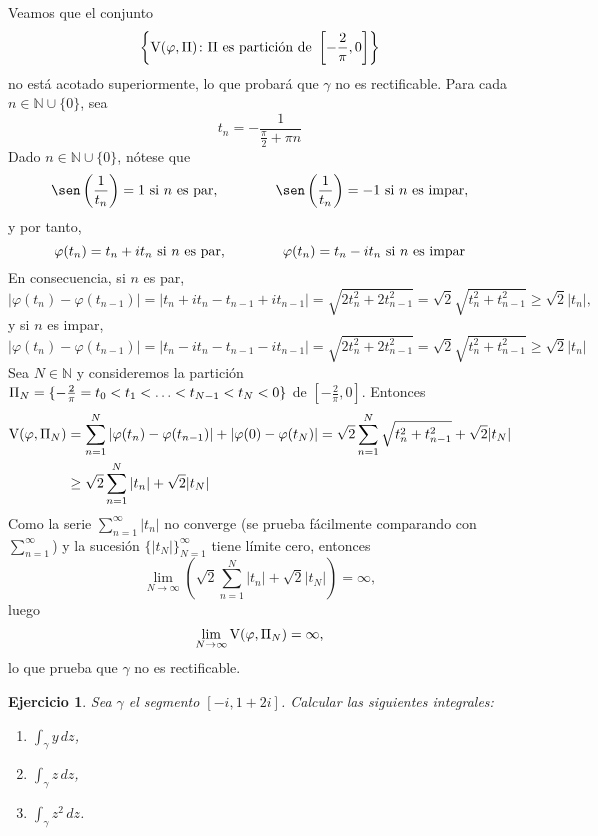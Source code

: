 \documentclass[11pt]{report}
\makeatletter
\renewenvironment{proof}[1][\proofname]{\par
  \pushQED{\qed}%
  \normalfont \topsep\z@skip %
  \trivlist
  \item[\hskip\labelsep
        \itshape
    #1\@addpunct{.}]\ignorespaces
}{%
  \popQED\endtrivlist\@endpefalse
}
\newcommand{\N}{\mathbb N}
\newtheorem{exercise}{Ejercicio}
\makeatother
\begin{document}
\begin{proof}
Veamos que el conjunto
\[\left\{\textup{V}(\varphi, \Pi) \colon \Pi \textup{ es partición de } \left[-\frac{2}{\pi},0\right]\right\}\]
no está acotado superiormente, lo que probará que $\gamma$ no es rectificable. Para cada $n \in \N \cup \{0\}$, sea
\[t_n = -\frac{1}{\frac{\pi}{2}+\pi n}\]
Dado $n \in \N \cup \{0\}$, nótese que \[\sen\left(\frac{1}{t_n}\right) = 1 \textup{ si } n \textup{ es par}, \qquad \qquad \sen\left(\frac{1}{t_n}\right) = -1 \textup{ si } n \textup{ es impar},\] y por tanto, \[\varphi(t_n) = t_n+it_n \textup{ si } n \textup{ es par}, \qquad \qquad \varphi(t_n) = t_n-it_n \textup{ si } n \textup{ es impar}\] En consecuencia, si $n$ es par,
\[\left|\varphi(t_n)-\varphi(t_{n-1})\right| =\left|t_n+it_n-t_{n-1}+it_{n-1}\right| = \sqrt{2t_n^2+2t_{n-1}^2} =\sqrt{2}\sqrt{t_n^2+t_{n-1}^2} \geq \sqrt{2}|t_n|,\]
y si $n$ es impar,
\[\left|\varphi(t_n)-\varphi(t_{n-1})\right| =\left|t_n-it_n-t_{n-1}-it_{n-1}\right| = \sqrt{2t_n^2+2t_{n-1}^2} =\sqrt{2}\sqrt{t_n^2+t_{n-1}^2} \geq \sqrt{2}|t_n|\]
Sea $N \in \N$ y consideremos la partición $\Pi_N = \{-\frac{2}{\pi} = t_0<t_1<\mathellipsis<t_{N-1}<t_N<0\}$ de $[-\frac{2}{\pi},0]$. Entonces
\[\begin{aligned}[t]
\textup{V}(\varphi,\Pi_N) &= \sum_{n=1}^N \left|\varphi(t_n)-\varphi(t_{n-1})\right|+\left|\varphi(0)-\varphi(t_N)\right| 
=  \sqrt{2}\sum_{n=1}^N \sqrt{t_n^2+t_{n-1}^2}+\sqrt{2}|t_N|\\ &\geq \sqrt{2}\sum_{n=1}^N |t_n|+\sqrt{2}|t_N| 
\end{aligned}
\]
Como la serie $\sum_{n=1}^\infty |t_n|$ no converge (se prueba fácilmente comparando con $\sum_{n=1}^\infty$) y la sucesión $\{|t_N|\}_{N=1}^\infty$ tiene límite cero, entonces
\[\lim_{N \to \infty}\left(\sqrt{2}\sum_{n=1}^N |t_n|+\sqrt{2}|t_N|\right) = \infty,\]
luego
\[\lim_{N \to \infty} \textup{V}(\varphi,\Pi_N) = \infty,\]
lo que prueba que $\gamma$ no es rectificable.
\end{proof}

\begin{exercise}
Sea $\gamma$ el segmento $[-i,1+2i]$. Calcular las siguientes integrales:
\begin{multicols}{3}
\begin{enumerate}
\centering
    \item $\displaystyle \int_\gamma y \, dz$,
    \item $\displaystyle \int_\gamma z \, dz$,
    \item $\displaystyle \int_\gamma z^2 \, dz$.
\end{enumerate}
\end{multicols}
\end{exercise}
\end{document}

